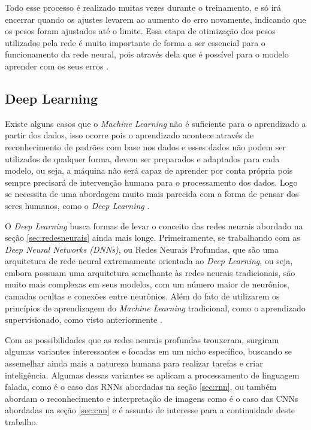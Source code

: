 Todo esse processo é realizado muitas vezes durante o treinamento, e só irá encerrar quando os ajustes levarem ao aumento do erro novamente, indicando que os pesos foram ajustados até o limite. Essa etapa de otimização dos pesos utilizados pela rede é muito importante de forma a ser essencial para o funcionamento da rede neural, pois através dela que é possível para o modelo aprender com os seus erros \cite{deepLearningTensorFlow}.

\subsection{Deep Learning}
Existe alguns casos que o \emph{Machine Learning} não é suficiente para o aprendizado a partir dos dados, isso ocorre pois o aprendizado acontece através de reconhecimento de padrões com base nos dados e esses dados não podem ser utilizados de qualquer forma, devem ser preparados e adaptados para cada modelo, ou seja, a máquina não será capaz de aprender por conta própria pois sempre precisará de intervenção humana para o processamento dos dados. Logo se necessita de uma abordagem muito mais parecida com a forma de pensar dos seres humanos, como o \emph{Deep Learning} \cite{deepLearningPython, deepLearningTensorFlow}.

O \emph{Deep Learning} busca formas de levar o conceito das redes neurais abordado na seção \ref{sec:redesneurais} ainda mais longe. Primeiramente, se trabalhando com as \emph{Deep Neural Networks (DNNs)}, ou Redes Neurais Profundas, que são uma arquitetura de rede neural extremamente orientada ao \emph{Deep Learning}, ou seja, embora possuam uma arquitetura semelhante às redes neurais tradicionais, são muito mais complexas em seus modelos, com um número maior de neurônios, camadas ocultas e conexões entre neurônios. Além do fato de utilizarem os princípios de aprendizagem do \emph{Machine Learning} tradicional, como o aprendizado supervisionado, como visto anteriormente \cite{deepLearningTensorFlow}.

Com as possibilidades que as redes neurais profundas trouxeram, surgiram algumas variantes interessantes e focadas em um nicho específico, buscando se assemelhar ainda mais a natureza humana para realizar tarefas e criar inteligência. Algumas dessas variantes se aplicam a processamento de linguagem falada, como é o caso das RNNs abordadas na seção \ref{sec:rnn}, ou também abordam o reconhecimento e interpretação de imagens como é o caso das CNNs abordadas na seção \ref{sec:cnn} e é assunto de interesse para a continuidade deste trabalho.

